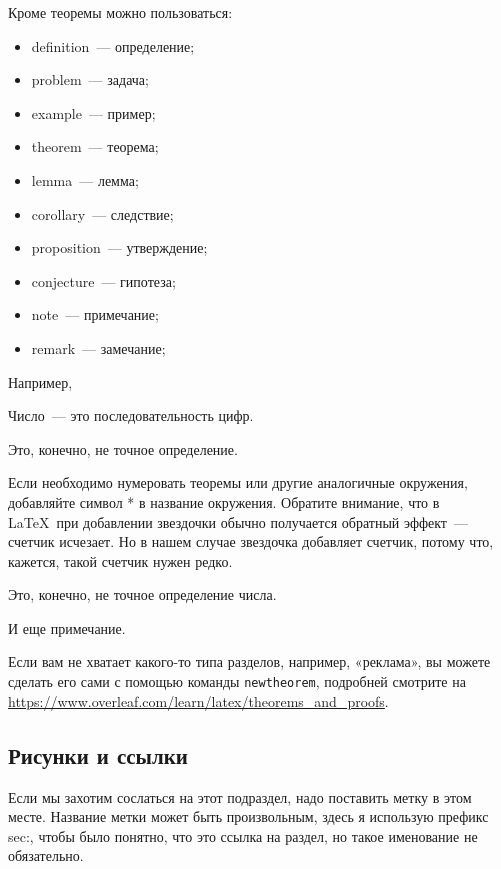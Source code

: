 \documentclass[russian]{lecture-notes}
\begin{document}
Кроме теоремы можно пользоваться:
\begin{itemize}
    \item definition~--- определение;
    \item problem~--- задача;
    \item example~--- пример;
    \item theorem~--- теорема;
    \item lemma~--- лемма;
    \item corollary~--- следствие;
    \item proposition~--- утверждение;
    \item conjecture~--- гипотеза;
    \item note~--- примечание;
    \item remark~--- замечание;
\end{itemize}

Например,

\begin{definition} Число~--- это последовательность цифр.
\end{definition}

\begin{remark}
Это, конечно, не точное определение.
\end{remark}

Если необходимо нумеровать теоремы или другие аналогичные окружения, добавляйте символ *
в название окружения. Обратите внимание, что в \LaTeX\ при добавлении звездочки обычно
получается обратный эффект~--- счетчик исчезает. Но в нашем случае звездочка добавляет
счетчик, потому что, кажется, такой счетчик нужен редко.

\begin{note*}
    Это, конечно, не точное определение числа.
\end{note*}
\begin{note*}
    И еще примечание.
\end{note*}

Если вам не хватает какого-то типа разделов, например, «реклама», вы можете сделать его
сами с помощью команды \texttt{newtheorem}, подробней смотрите на
\url{https://www.overleaf.com/learn/latex/theorems_and_proofs}.


\subsection{Рисунки и ссылки}
Если мы захотим сослаться на этот подраздел, надо поставить метку в этом месте.
Название метки может быть произвольным, здесь я использую префикс sec:, чтобы
было понятно, что это ссылка на раздел, но такое именование не обязательно.
\label{sec:images-and-refs}
\end{document}
